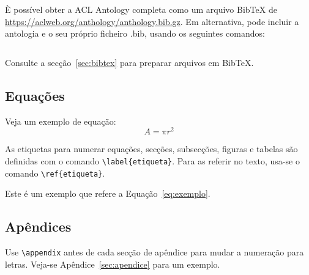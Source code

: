 \documentclass[11pt]{article}
\begin{document}
È possível obter a ACL Antology completa como um arquivo Bib\TeX{} de \url{https://aclweb.org/anthology/anthology.bib.gz}.
Em alternativa, pode incluir a antologia e o seu próprio ficheiro .bib, usando os seguintes comandos: 
\begin{quote}
\begin{verbatim}

\end{verbatim}
\end{quote}

Consulte a secção~\ref{sec:bibtex} para preparar arquivos em Bib\TeX{}.

\subsection{Equações}

Veja um exemplo de equação:
\begin{equation}
  \label{eq:exemplo}
  A = \pi r^2
\end{equation}

As etiquetas para numerar equações, secções, subsecções, figuras e tabelas são definidas com o comando \verb|\label{etiqueta}|. Para as referir no texto, usa-se o comando \verb|\ref{etiqueta}|.

Este é um exemplo que refere a Equação~\ref{eq:exemplo}.

\subsection{Apêndices}

Use \verb|\appendix| antes de cada secção de apêndice para mudar a numeração para letras. Veja-se Apêndice~\ref{sec:apendice} para um exemplo.
\end{document}
